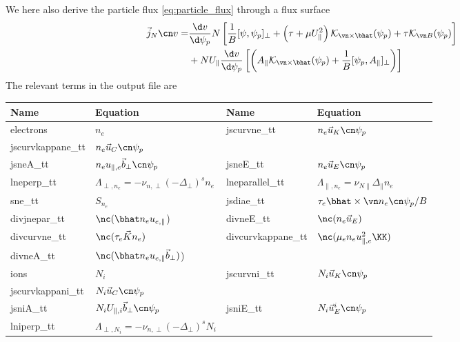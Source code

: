 We here also derive the particle flux \eqref{eq:particle_flux} through a flux surface
\begin{align} \label{eq:radial_particle_flux}
 \vec j_{N}\cn v %
 =&
  \frac{\d v}{\d \psi_p} N\left[\frac{1}{B}[\psi, \psi_p]_\perp + \left(\tau + \mu U_\parallel^2\right)
   \mathcal K_{\vn\times\bhat}(\psi_p) + \tau  \mathcal K_{\vn B}(\psi_p) \right] \nonumber\\
 &+ NU_\parallel\frac{\d v}{\d \psi_p}\left [\left( A_\parallel \mathcal
 K_{\vn\times\bhat}(\psi_p) + \frac{1}{B}[\psi_p, A_\parallel]_\perp\right) \right]
\end{align}
The relevant terms in the output file are
\begin{longtable}{llll}
\toprule
\rowcolor{gray!50}\textbf{Name} &  \textbf{Equation} & \textbf{Name} &  \textbf{Equation}\\
\midrule
    electrons & $n_e$ &
    jscurvne\_tt &$ n_e  \vec u_K \cn \psi_p$ \\
    jscurvkappane\_tt &$ n_e  \vec u_C \cn \psi_p$ &
    & \\
    jsneA\_tt &$ n_e u_{\parallel,e} \vec{ b}_\perp  \cn \psi_p$ &
    jsneE\_tt & $ n_e \vec u_E\cn\psi_p$ \\
    lneperp\_tt &$ \Lambda_{\perp,n_e} = -\nu_{n,\perp} (-\Delta_\perp)^s n_e$&
    lneparallel\_tt &$ \Lambda_{\parallel,n_e} = \nu_{N\parallel} \Delta_\parallel n_e$ \\
    sne\_tt & $S_{n_e}$ &
    jsdiae\_tt & $\tau_e \bhat \times \vn n_e \cn \psi_p /B$\\
    divjnepar\_tt & $\nc (\bhat n_e u_{e,\parallel}$) &
    divneE\_tt & $\nc ( n_e \vec u_E)$ \\
    divcurvne\_tt & $\nc( \tau_e \vec K n_e)$ &
    divcurvkappane\_tt & $\nc( \mu_e n_e u_{\parallel,e}^2 \KK)$ \\
    divneA\_tt & $\nc (\bhat n_e u_{e,\parallel} {\vec b}_\perp)$) &
     &  \\
    ions & $N_i$ &
    jscurvni\_tt &$ N_i \vec u_K \cn \psi_p$ \\
    jscurvkappani\_tt &$ N_i \vec u_C \cn \psi_p$ &
    & \\
    jsniA\_tt &$ N_i U_{\parallel,i} \vec{ b}_\perp  \cn \psi_p$ &
    jsniE\_tt & $ N_i \vec u^i_E\cn\psi_p$ \\
    lniperp\_tt &$ \Lambda_{\perp,N_i} = -\nu_{n,\perp} (-\Delta_\perp)^s N_i$&

\end{longtable}
